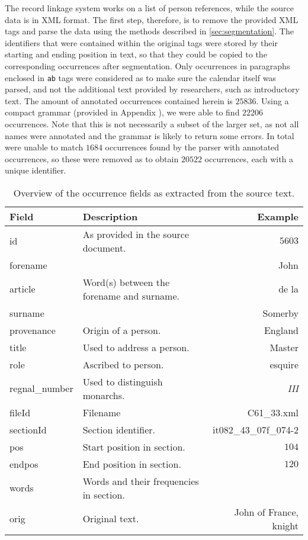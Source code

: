 The record linkage system works on a list of person references, while the source data is in XML format.
The first step, therefore, is to remove the provided XML tags and parse the data using the methods described in \cref{sec:segmentation}.
The identifiers that were contained within the original tags were stored by their starting and ending position in text, so that they could be copied to the corresponding occurrences after segmentation.
Only occurrences in paragraphs enclosed in \texttt{ab} tags were considered as to make sure the calendar itself was parsed, and not the additional text provided by researchers, such as introductory text.
The amount of annotated occurrences contained herein is $25836$.
Using a compact grammar (provided in Appendix ), we were able to find $22206$ occurrences.
Note that this is not necessarily a subset of the larger set, as not all names were annotated and the grammar is likely to return some errors. 
In total were unable to match $1684$ occurrences found by the parser with annotated occurrences, so these were removed as to obtain $20522$ occurrences, each with a unique identifier.

\begin{table}
    \footnotesize
    \centering
    \begin{tabularx}{\textwidth}{l X r}
        \toprule
        \textbf{Field} & \textbf{Description} & \textbf{Example} \\
        \midrule
        id & As provided in the source document. & $5603$ \\
        forename & & John \\
        article & Word(s) between the forename and surname. & de la \\
        surname & & Somerby \\
        provenance & Origin of a person. & England \\
        title & Used to address a person. & Master \\
        role & Ascribed to person. & esquire \\
        regnal\_number & Used to distinguish monarchs. & \emph{III} \\
        fileId & Filename & C61\_33.xml \\
        sectionId & Section identifier. & it082\_43\_07f\_074-2 \\
        pos & Start position in section. & $104$ \\
        endpos & End position in section. & $120$ \\
        words & Words and their frequencies in section. & \\
        orig & Original text. & John of France, knight \\
        \bottomrule
    \end{tabularx}
    \caption{Overview of the occurrence fields as extracted from the source text.}
    \label{tab:occurrence_overview}
\end{table}

